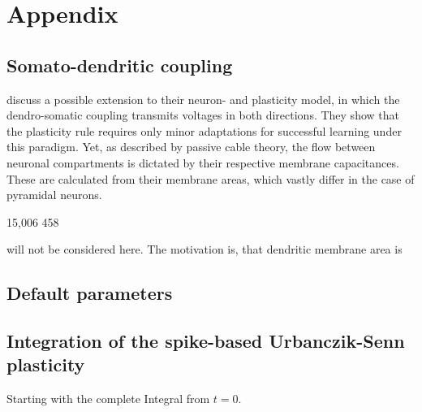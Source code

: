 
\chapter{Appendix}



\section{Somato-dendritic coupling}\label{sec-somato-dendr}

\citep{urbanczik2014learning} discuss a possible extension to their neuron- and plasticity model, in which the
dendro-somatic coupling transmits voltages in both directions. They show that the plasticity rule requires only minor
adaptations for successful learning under this paradigm. Yet, as described by passive cable theory, the flow between
neuronal compartments is dictated by their respective membrane capacitances. These are calculated from their membrane
areas, which vastly differ in the case of pyramidal neurons. 


15,006 458


will not be considered here. The motivation is, that dendritic membrane area is



\section{Default parameters}

\section{Integration of the spike-based Urbanczik-Senn plasticity}



Starting with the complete Integral from $t=0$.

